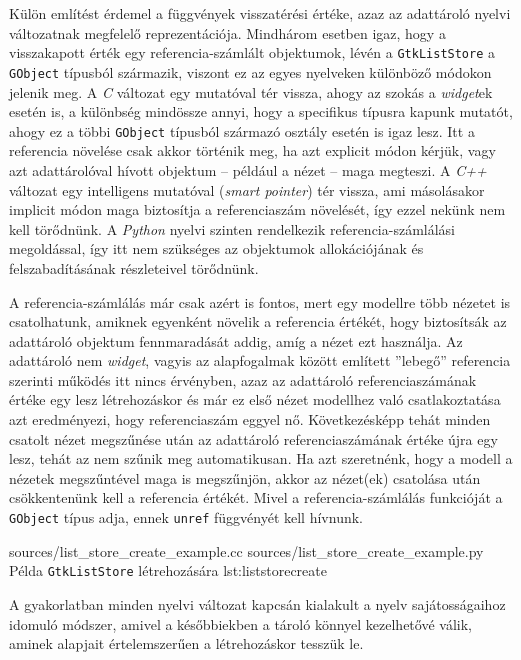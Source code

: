 Külön említést érdemel a függvények visszatérési értéke, azaz az adattároló nyelvi változatnak megfelelő reprezentációja. Mindhárom esetben igaz, hogy a visszakapott érték egy referencia-számlált objektumok, lévén a \texttt{GtkListStore} a \texttt{GObject} típusból származik, viszont ez az egyes nyelveken különböző módokon jelenik meg. A \textit{C} változat egy mutatóval tér vissza, ahogy az szokás a \textit{widget}ek esetén is, a különbség mindössze annyi, hogy a specifikus típusra kapunk mutatót, ahogy ez a többi \texttt{GObject} típusból származó osztály esetén is igaz lesz. Itt a referencia növelése csak akkor történik meg, ha azt explicit módon kérjük, vagy azt adattárolóval hívott objektum -- például a nézet -- maga megteszi. A \textit{C++} változat egy intelligens mutatóval (\textit{smart pointer}) tér vissza, ami másolásakor implicit módon maga biztosítja a referenciaszám növelését, így ezzel nekünk nem kell törődnünk. A \textit{Python} nyelvi szinten rendelkezik referencia-számlálási megoldással, így itt nem szükséges az objektumok allokációjának és felszabadításának részleteivel törődnünk.

A referencia-számlálás már csak azért is fontos, mert egy modellre több nézetet is csatolhatunk, amiknek egyenként növelik a referencia értékét, hogy biztosítsák az adattároló objektum fennmaradását addig, amíg a nézet ezt használja. Az adattároló nem \textit{widget}, vagyis az alapfogalmak között említett ''lebegő'' referencia szerinti működés itt nincs érvényben, azaz az adattároló referenciaszámának értéke egy lesz létrehozáskor és már ez első nézet modellhez való csatlakoztatása azt eredményezi, hogy referenciaszám eggyel nő. Következésképp tehát minden csatolt nézet megszűnése után az adattároló referenciaszámának értéke újra egy lesz, tehát az nem szűnik meg automatikusan. Ha azt szeretnénk, hogy a modell a nézetek megszűntével maga is megszűnjön, akkor az nézet(ek) csatolása után csökkentenünk kell a referencia értékét. Mivel a referencia-számlálás funkcióját a \texttt{GObject} típus adja, ennek \texttt{unref} függvényét kell hívnunk.

{sources/list_store_create_example.cc}
{sources/list_store_create_example.py}
{Példa \texttt{GtkListStore} létrehozására}
{lst:liststorecreate}

A gyakorlatban minden nyelvi változat kapcsán kialakult a nyelv sajátosságaihoz idomuló módszer, amivel a későbbiekben a tároló könnyel kezelhetővé válik, aminek alapjait értelemszerűen a létrehozáskor tesszük le.

